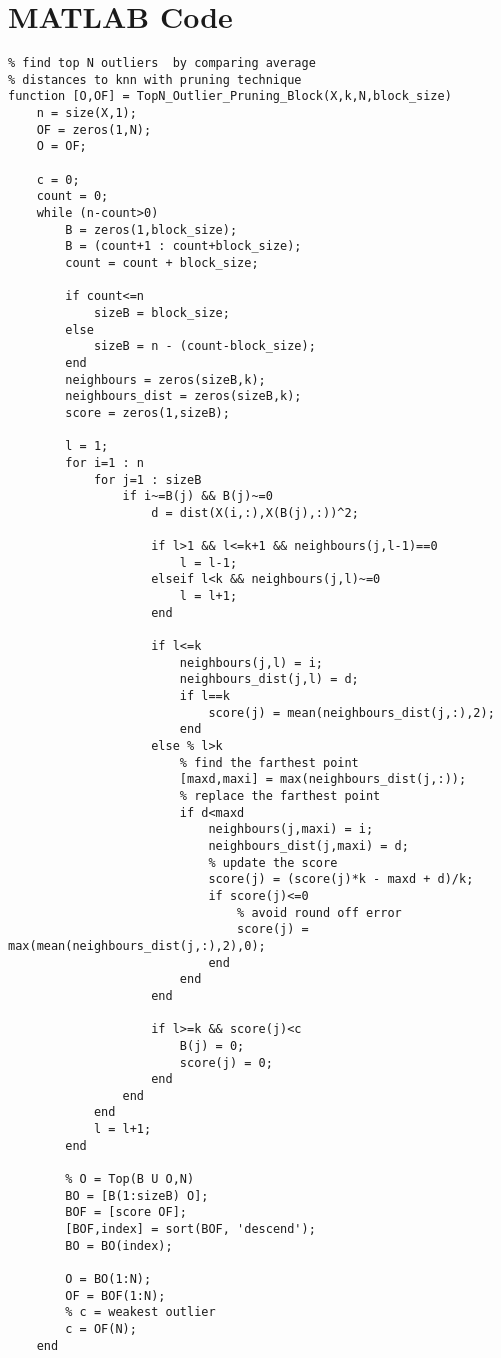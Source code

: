 \chapter{MATLAB Code}
\label{apdx:matlabCode}
\lstset{language=Matlab}
\begin{lstlisting}
% find top N outliers  by comparing average 
% distances to knn with pruning technique
function [O,OF] = TopN_Outlier_Pruning_Block(X,k,N,block_size)
	n = size(X,1);
	OF = zeros(1,N);
	O = OF;

	c = 0;
	count = 0;
	while (n-count>0)
		B = zeros(1,block_size);
		B = (count+1 : count+block_size);
		count = count + block_size;        
		
		if count<=n
			sizeB = block_size;
		else
			sizeB = n - (count-block_size);
		end
		neighbours = zeros(sizeB,k);
		neighbours_dist = zeros(sizeB,k);
		score = zeros(1,sizeB);

		l = 1;
		for i=1 : n
			for j=1 : sizeB
				if i~=B(j) && B(j)~=0
					d = dist(X(i,:),X(B(j),:))^2;
		            
					if l>1 && l<=k+1 && neighbours(j,l-1)==0
						l = l-1;
					elseif l<k && neighbours(j,l)~=0
						l = l+1;
					end
		            
					if l<=k 
						neighbours(j,l) = i;   
						neighbours_dist(j,l) = d;
						if l==k
							score(j) = mean(neighbours_dist(j,:),2);
						end
					else % l>k
						% find the farthest point
						[maxd,maxi] = max(neighbours_dist(j,:));
						% replace the farthest point
						if d<maxd 
							neighbours(j,maxi) = i;
							neighbours_dist(j,maxi) = d;
							% update the score
							score(j) = (score(j)*k - maxd + d)/k;
							if score(j)<=0
								% avoid round off error
								score(j) = max(mean(neighbours_dist(j,:),2),0);
							end
						end                    
					end
		            
					if l>=k && score(j)<c
						B(j) = 0;                    
						score(j) = 0;                   
					end                                            
				end
			end
			l = l+1;
		end
		
		% O = Top(B U O,N)
		BO = [B(1:sizeB) O];
		BOF = [score OF];
		[BOF,index] = sort(BOF, 'descend');
		BO = BO(index);
		
		O = BO(1:N);
		OF = BOF(1:N);    
		% c = weakest outlier
		c = OF(N);
	end
\end{lstlisting}

